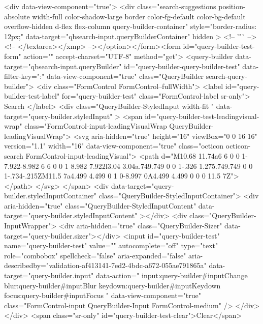           <div data-view-component="true">        <div class="search-suggestions position-absolute width-full color-shadow-large border color-fg-default color-bg-default overflow-hidden d-flex flex-column query-builder-container"
          style="border-radius: 12px;"
          data-target="qbsearch-input.queryBuilderContainer"
          hidden
        >
          <!-- '"` --><!-- </textarea></xmp> --></option></form><form id="query-builder-test-form" action="" accept-charset="UTF-8" method="get">
  <query-builder data-target="qbsearch-input.queryBuilder" id="query-builder-query-builder-test" data-filter-key=":" data-view-component="true" class="QueryBuilder search-query-builder">
    <div class="FormControl FormControl--fullWidth">
      <label id="query-builder-test-label" for="query-builder-test" class="FormControl-label sr-only">
        Search
      </label>
      <div
        class="QueryBuilder-StyledInput width-fit "
        data-target="query-builder.styledInput"
      >
          <span id="query-builder-test-leadingvisual-wrap" class="FormControl-input-leadingVisualWrap QueryBuilder-leadingVisualWrap">
            <svg aria-hidden="true" height="16" viewBox="0 0 16 16" version="1.1" width="16" data-view-component="true" class="octicon octicon-search FormControl-input-leadingVisual">
    <path d="M10.68 11.74a6 6 0 0 1-7.922-8.982 6 6 0 0 1 8.982 7.922l3.04 3.04a.749.749 0 0 1-.326 1.275.749.749 0 0 1-.734-.215ZM11.5 7a4.499 4.499 0 1 0-8.997 0A4.499 4.499 0 0 0 11.5 7Z"></path>
</svg>
          </span>
        <div data-target="query-builder.styledInputContainer" class="QueryBuilder-StyledInputContainer">
          <div
            aria-hidden="true"
            class="QueryBuilder-StyledInputContent"
            data-target="query-builder.styledInputContent"
          ></div>
          <div class="QueryBuilder-InputWrapper">
            <div aria-hidden="true" class="QueryBuilder-Sizer" data-target="query-builder.sizer"></div>
            <input id="query-builder-test" name="query-builder-test" value="" autocomplete="off" type="text" role="combobox" spellcheck="false" aria-expanded="false" aria-describedby="validation-af413141-7ed2-4bdc-a672-055ae791865a" data-target="query-builder.input" data-action="
          input:query-builder#inputChange
          blur:query-builder#inputBlur
          keydown:query-builder#inputKeydown
          focus:query-builder#inputFocus
        " data-view-component="true" class="FormControl-input QueryBuilder-Input FormControl-medium" />
          </div>
        </div>
          <span class="sr-only" id="query-builder-test-clear">Clear</span>

